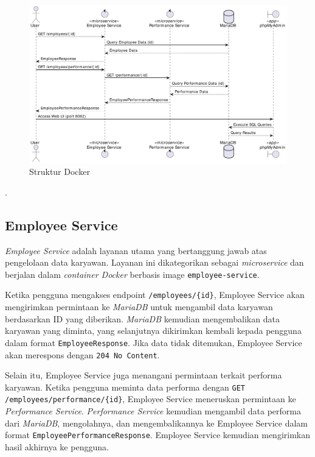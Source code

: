 \begin{figure}[h]
	\centering
	\includegraphics[width=\textwidth]{../images/out/microservices-employees}
	\caption{Struktur Docker}
	\label{fig:employee_performance}
\end{figure}


.

\subsection{Employee Service}

\textit{Employee Service} adalah layanan utama yang bertanggung jawab atas pengelolaan data karyawan. Layanan ini dikategorikan sebagai \textit{microservice} dan berjalan dalam \textit{container Docker} berbasis image \texttt{employee-service}. 

Ketika pengguna mengakses endpoint \texttt{/employees/\{id\}}, Employee Service akan mengirimkan permintaan ke \textit{MariaDB} untuk mengambil data karyawan berdasarkan ID yang diberikan. \textit{MariaDB} kemudian mengembalikan data karyawan yang diminta, yang selanjutnya dikirimkan kembali kepada pengguna dalam format \texttt{EmployeeResponse}. Jika data tidak ditemukan, Employee Service akan merespons dengan \texttt{204 No Content}.

Selain itu, Employee Service juga menangani permintaan terkait performa karyawan. Ketika pengguna meminta data performa dengan \texttt{GET /employees/performance/\{id\}}, Employee Service meneruskan permintaan ke \textit{Performance Service}. \textit{Performance Service} kemudian mengambil data performa dari \textit{MariaDB}, mengolahnya, dan mengembalikannya ke Employee Service dalam format \texttt{EmployeePerformanceResponse}. Employee Service kemudian mengirimkan hasil akhirnya ke pengguna.

